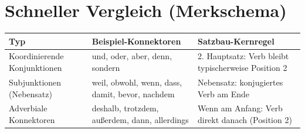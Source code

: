 \documentclass[a4paper,12pt]{article}
\begin{document}
    \section{Schneller Vergleich (Merkschema)}
        \begin{longtable}{@{}p{}p{}p{}@{}}
            \toprule
            Typ & Beispiel-Konnektoren & Satzbau-Kernregel \\
            \midrule
            \endhead
            Koordinierende Konjunktionen &
            und, oder, aber, denn, sondern &
            2. Hauptsatz: Verb bleibt typischerweise Position 2 \\
            \addlinespace
            Subjunktionen (Nebensatz) &
            weil, obwohl, wenn, dass, damit, bevor, nachdem &
            Nebensatz: konjugiertes Verb am Ende \\
            \addlinespace
            Adverbiale Konnektoren &
            deshalb, trotzdem, au\ss erdem, dann, allerdings &
            Wenn am Anfang: Verb direkt danach (Position 2) \\
            \bottomrule
        \end{longtable}
\end{document}
